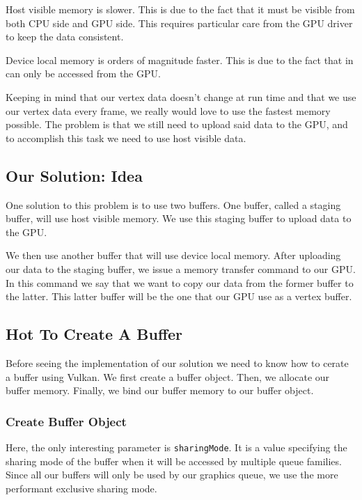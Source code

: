 Host visible memory is slower.
This is due to the fact that it must be visible from both CPU side and GPU side.
This requires particular care from the GPU driver to keep the data consistent.

Device local memory is orders of magnitude faster.
This is due to the fact that in can only be accessed from the GPU.

Keeping in mind that our vertex data doesn't change at run time and that
we use our vertex data every frame, we really would love to use the fastest memory
possible.
The problem is that we still need to upload said data to the GPU, and to accomplish
this task we need to use host visible data.

\subsection{Our Solution: Idea}

One solution to this problem is to use two buffers.
One buffer, called a staging buffer, will use host visible memory.
We use this staging buffer to upload data to the GPU.

We then use another buffer that will use device local memory.
After uploading our data to the staging buffer, we issue a memory transfer command
to our GPU.
In this command we say that we want to copy our data from the former buffer to
the latter.
This latter buffer will be the one that our GPU use as a vertex buffer.

\subsection{Hot To Create A Buffer}

Before seeing the implementation of our solution we need to know how to cerate
a buffer using Vulkan.
We first create a buffer object.
Then, we allocate our buffer memory.
Finally, we bind our buffer memory to our buffer object.

\subsubsection{Create Buffer Object}

Here, the only interesting parameter is \texttt{sharingMode}.
It is a value specifying the sharing mode of the buffer when it will
be accessed by multiple queue families.
Since all our buffers will only be used by our graphics queue, we use the more
performant exclusive sharing mode.

